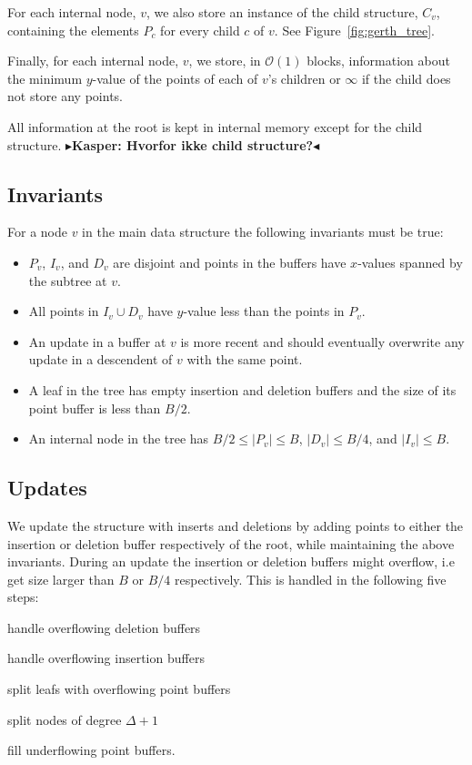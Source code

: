\documentclass[twoside,11pt,openright]{report}
\newcommand{\todo}[1]{{\color[rgb]{.5,0,0}\textbf{$\blacktriangleright$#1$\blacktriangleleft$}}}
\begin{document}
For each internal node, $v$, we also store an instance of the child structure, $C_v$, containing the elements $P_c$ for every child $c$ of $v$. See Figure~\ref{fig:gerth_tree}.

Finally, for each internal node, $v$, we store, in $\mathcal{O}(1)$ blocks, information about the minimum $y$-value of the points of each of $v$'s children or $\infty$ if the child does not store any points.

All information at the root is kept in internal memory except for the child structure.
\todo{Kasper: Hvorfor ikke child structure?}

\subsection{Invariants}
For a node $v$ in the main data structure the following invariants must be true:
\begin{itemize}
	\item $P_v$, $I_v$, and $D_v$ are disjoint and points in the buffers have $x$-values spanned by the subtree at $v$.
	\item All points in $I_v \cup D_v$ have $y$-value less than the points in $P_v$.
	\item An update in a buffer at $v$ is more recent and should eventually overwrite any update in a descendent of $v$ with the same point.
	\item A leaf in the tree has empty insertion and deletion buffers and the size of its point buffer is less than $B/2$.
	\item An internal node in the tree has $B/2 \leq \vert P_v \vert \leq B$, $\vert D_v \vert \leq B/4$, and $\vert I_v \vert \leq B$.
\end{itemize}

\subsection{Updates}
\label{subsec:gerth_updates}
We update the structure with inserts and deletions by adding points to either the insertion or deletion buffer respectively of the root, while maintaining the above invariants.
During an update the insertion or deletion buffers might overflow, i.e get size larger than $B$ or $B/4$ respectively. This is handled in the following five steps:
\begin{inlinelist}
	\item handle overflowing deletion buffers
	\item handle overflowing insertion buffers
	\item split leafs with overflowing point buffers
	\item split nodes of degree $\Delta+1$
	\item fill underflowing point buffers.
\end{inlinelist}
\end{document}
